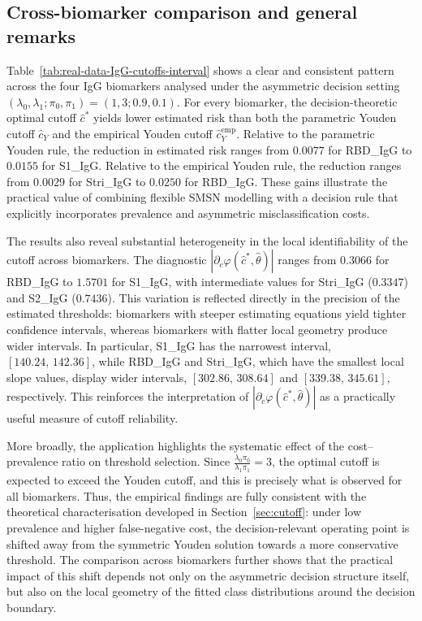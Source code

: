 \documentclass[11pt,a4paper]{article}
\theoremstyle{definition}
\theoremstyle{remark}
\newcommand{\1}{\mathbf{1}}
\begin{document}
\subsection{Cross-biomarker comparison and general remarks}

Table~\ref{tab:real-data-IgG-cutoffs-interval} shows a clear and
consistent pattern across the four IgG biomarkers analysed under the
asymmetric decision setting
$(\lambda_0,\lambda_1;\pi_0,\pi_1)=(1,3;0.9,0.1)$.
For every biomarker, the decision-theoretic optimal cutoff
$\hat c^*$ yields lower estimated risk than both the parametric
Youden cutoff $\hat c_Y$ and the empirical Youden cutoff
$\hat c_Y^{\mathrm{emp}}$.
Relative to the parametric Youden rule, the reduction in estimated
risk ranges from $0.0077$ for RBD\_IgG to $0.0155$ for S1\_IgG.
Relative to the empirical Youden rule, the reduction ranges from
$0.0029$ for Stri\_IgG to $0.0250$ for RBD\_IgG.
These gains illustrate the practical value of combining flexible SMSN
modelling with a decision rule that explicitly incorporates prevalence
and asymmetric misclassification costs.

The results also reveal substantial heterogeneity in the local
identifiability of the cutoff across biomarkers.
The diagnostic $|\partial_c\varphi(\hat c^*,\hat\theta)|$ ranges from
$0.3066$ for RBD\_IgG to $1.5701$ for S1\_IgG, with intermediate values
for Stri\_IgG ($0.3347$) and S2\_IgG ($0.7436$).
This variation is reflected directly in the precision of the estimated
thresholds: biomarkers with steeper estimating equations yield tighter
confidence intervals, whereas biomarkers with flatter local geometry
produce wider intervals.
In particular, S1\_IgG has the narrowest interval,
$[140.24,\,142.36]$, while RBD\_IgG and Stri\_IgG, which have the
smallest local slope values, display wider intervals,
$[302.86,\,308.64]$ and $[339.38,\,345.61]$, respectively.
This reinforces the interpretation of
$|\partial_c\varphi(\hat c^*,\hat\theta)|$ as a practically useful
measure of cutoff reliability.

More broadly, the application highlights the systematic effect of the
cost--prevalence ratio on threshold selection.
Since $\frac{\lambda_0\pi_0}{\lambda_1\pi_1}=3$,
the optimal cutoff is expected to exceed the Youden cutoff, and this
is precisely what is observed for all biomarkers.
Thus, the empirical findings are fully consistent with the theoretical
characterisation developed in Section~\ref{sec:cutoff}: under
low prevalence and higher false-negative cost, the decision-relevant
operating point is shifted away from the symmetric Youden solution
towards a more conservative threshold.
The comparison across biomarkers further shows that the practical
impact of this shift depends not only on the asymmetric decision
structure itself, but also on the local geometry of the fitted class
distributions around the decision boundary.
\end{document}
